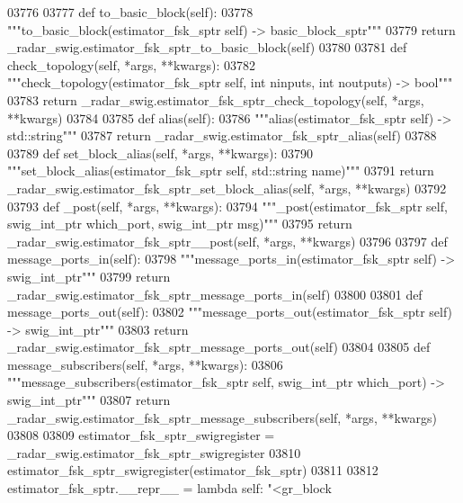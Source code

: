 \begin{DoxyCode}
{{{{{{{{{{{{{03776 
03777     \textcolor{keyword}{def }to_basic_block(self):
03778         \textcolor{stringliteral}{"""to\_basic\_block(estimator\_fsk\_sptr self) -> basic\_block\_sptr"""}
03779         \textcolor{keywordflow}{return} \_radar\_swig.estimator\_fsk\_sptr\_to\_basic\_block(self)
03780 
03781     \textcolor{keyword}{def }check_topology(self, *args, **kwargs):
03782         \textcolor{stringliteral}{"""check\_topology(estimator\_fsk\_sptr self, int ninputs, int noutputs) -> bool"""}
03783         \textcolor{keywordflow}{return} \_radar\_swig.estimator\_fsk\_sptr\_check\_topology(self, *args, **kwargs)
03784 
03785     \textcolor{keyword}{def }alias(self):
03786         \textcolor{stringliteral}{"""alias(estimator\_fsk\_sptr self) -> std::string"""}
03787         \textcolor{keywordflow}{return} \_radar\_swig.estimator\_fsk\_sptr\_alias(self)
03788 
03789     \textcolor{keyword}{def }set_block_alias(self, *args, **kwargs):
03790         \textcolor{stringliteral}{"""set\_block\_alias(estimator\_fsk\_sptr self, std::string name)"""}
03791         \textcolor{keywordflow}{return} \_radar\_swig.estimator\_fsk\_sptr\_set\_block\_alias(self, *args, **kwargs)
03792 
03793     \textcolor{keyword}{def }_post(self, *args, **kwargs):
03794         \textcolor{stringliteral}{"""\_post(estimator\_fsk\_sptr self, swig\_int\_ptr which\_port, swig\_int\_ptr msg)"""}
03795         \textcolor{keywordflow}{return} \_radar\_swig.estimator\_fsk\_sptr\_\_post(self, *args, **kwargs)
03796 
03797     \textcolor{keyword}{def }message_ports_in(self):
03798         \textcolor{stringliteral}{"""message\_ports\_in(estimator\_fsk\_sptr self) -> swig\_int\_ptr"""}
03799         \textcolor{keywordflow}{return} \_radar\_swig.estimator\_fsk\_sptr\_message\_ports\_in(self)
03800 
03801     \textcolor{keyword}{def }message_ports_out(self):
03802         \textcolor{stringliteral}{"""message\_ports\_out(estimator\_fsk\_sptr self) -> swig\_int\_ptr"""}
03803         \textcolor{keywordflow}{return} \_radar\_swig.estimator\_fsk\_sptr\_message\_ports\_out(self)
03804 
03805     \textcolor{keyword}{def }message_subscribers(self, *args, **kwargs):
03806         \textcolor{stringliteral}{"""message\_subscribers(estimator\_fsk\_sptr self, swig\_int\_ptr which\_port) -> swig\_int\_ptr"""}
03807         \textcolor{keywordflow}{return} \_radar\_swig.estimator\_fsk\_sptr\_message\_subscribers(self, *args, **kwargs)
03808 
03809 estimator\_fsk\_sptr\_swigregister = \_radar\_swig.estimator\_fsk\_sptr\_swigregister
03810 estimator_fsk_sptr_swigregister(estimator\_fsk\_sptr)
03811 
03812 estimator\_fsk\_sptr.\_\_repr\_\_ = \textcolor{keyword}{lambda} self: \textcolor{stringliteral}{"<gr\_block %
}}}}}}}}}}}}}}
\end{DoxyCode}
